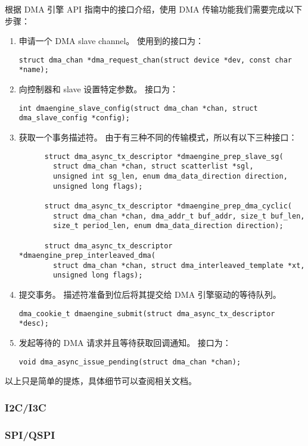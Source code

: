 根据 DMA 引擎 API 指南中的接口介绍，使用 DMA 传输功能我们需要完成以下步骤：

\begin{enumerate}
  \item 申请一个 DMA slave channel。
    使用到的接口为：

    \lstinline!struct dma_chan *dma_request_chan(struct device *dev, const char *name);!

  \item 向控制器和 slave 设置特定参数。
    接口为：

    \lstinline!int dmaengine_slave_config(struct dma_chan *chan, struct dma_slave_config *config);!

  \item 获取一个事务描述符。
    由于有三种不同的传输模式，所以有以下三种接口：
    \begin{lstlisting}
      struct dma_async_tx_descriptor *dmaengine_prep_slave_sg(
        struct dma_chan *chan, struct scatterlist *sgl,
        unsigned int sg_len, enum dma_data_direction direction,
        unsigned long flags);

      struct dma_async_tx_descriptor *dmaengine_prep_dma_cyclic(
        struct dma_chan *chan, dma_addr_t buf_addr, size_t buf_len,
        size_t period_len, enum dma_data_direction direction);

      struct dma_async_tx_descriptor *dmaengine_prep_interleaved_dma(
        struct dma_chan *chan, struct dma_interleaved_template *xt,
        unsigned long flags);
    \end{lstlisting}
  \item 提交事务。
    描述符准备到位后将其提交给 DMA 引擎驱动的等待队列。

    \lstinline!dma_cookie_t dmaengine_submit(struct dma_async_tx_descriptor *desc);!

  \item 发起等待的 DMA 请求并且等待获取回调通知。
    接口为：

    \lstinline!void dma_async_issue_pending(struct dma_chan *chan);!
\end{enumerate}

以上只是简单的提炼，具体细节可以查阅相关文档。

\subsubsection{I2C/I3C}

\subsubsection{SPI/QSPI}

